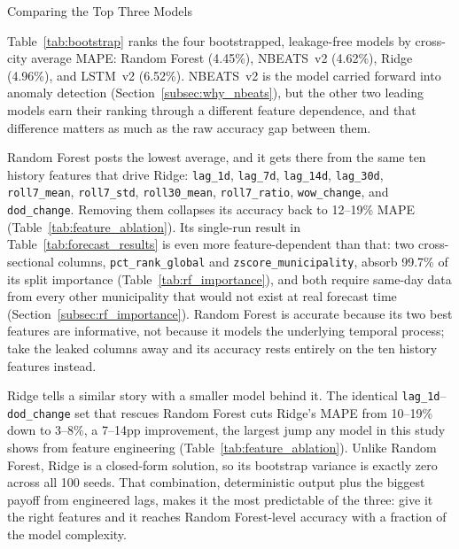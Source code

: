 ﻿\documentclass[12pt,reqno, twoside]{amsbook}
\makeatletter
\numberwithin{figure}{chapter}
\numberwithin{table}{chapter}
\numberwithin{equation}{chapter}
\def\subsection{\@startsection{subsection}{2}%
      \z@{.5\linespacing\@plus.7\linespacing}{.25\linespacing}%
      {\normalfont\bfseries\flushleft}}
\theoremstyle{plain}
\numberwithin{equation}{chapter}
\numberwithin{section}{chapter}
\makeatother
\begin{document}
\FloatBarrier

\subsection{Comparing the Top Three Models}
\label{subsec:top_three}

Table~\ref{tab:bootstrap} ranks the four bootstrapped, leakage-free models by cross-city average \ac{MAPE}: Random Forest (4.45\%), \ac{NBEATS}~v2 (4.62\%), Ridge (4.96\%), and \ac{LSTM}~v2 (6.52\%). \ac{NBEATS}~v2 is the model carried forward into anomaly detection (Section~\ref{subsec:why_nbeats}), but the other two leading models earn their ranking through a different feature dependence, and that difference matters as much as the raw accuracy gap between them.

Random Forest posts the lowest average, and it gets there from the same ten history features that drive Ridge: \texttt{lag\_1d}, \texttt{lag\_7d}, \texttt{lag\_14d}, \texttt{lag\_30d}, \texttt{roll7\_mean}, \texttt{roll7\_std}, \texttt{roll30\_mean}, \texttt{roll7\_ratio}, \texttt{wow\_change}, and \texttt{dod\_change}. Removing them collapses its accuracy back to 12--19\% \ac{MAPE} (Table~\ref{tab:feature_ablation}). Its single-run result in Table~\ref{tab:forecast_results} is even more feature-dependent than that: two cross-sectional columns, \texttt{pct\_rank\_global} and \texttt{zscore\_municipality}, absorb 99.7\% of its split importance (Table~\ref{tab:rf_importance}), and both require same-day data from every other municipality that would not exist at real forecast time (Section~\ref{subsec:rf_importance}). Random Forest is accurate because its two best features are informative, not because it models the underlying temporal process; take the leaked columns away and its accuracy rests entirely on the ten history features instead.

Ridge tells a similar story with a smaller model behind it. The identical \texttt{lag\_1d}--\texttt{dod\_change} set that rescues Random Forest cuts Ridge's \ac{MAPE} from 10--19\% down to 3--8\%, a 7--14pp improvement, the largest jump any model in this study shows from feature engineering (Table~\ref{tab:feature_ablation}). Unlike Random Forest, Ridge is a closed-form solution, so its bootstrap variance is exactly zero across all 100 seeds. That combination, deterministic output plus the biggest payoff from engineered lags, makes it the most predictable of the three: give it the right features and it reaches Random Forest-level accuracy with a fraction of the model complexity.
\end{document}
